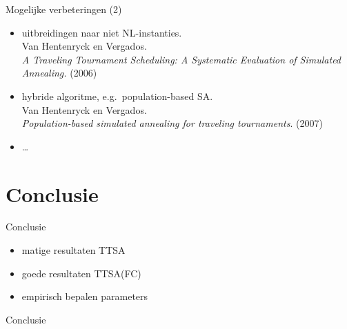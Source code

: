 \documentclass{beamer}
\begin{document}
\begin{frame}{Mogelijke verbeteringen (2)}
 \begin{itemize}[<+->]
  \item uitbreidingen naar niet NL-instanties. \\Van Hentenryck en Vergados. \\\emph{A Traveling Tournament Scheduling: A Systematic Evaluation of Simulated Annealing.} (2006)
  \item hybride algoritme, e.g.~population-based SA. \\Van Hentenryck en Vergados. \\\emph{Population-based simulated annealing for traveling tournaments}. (2007)
  \item \ldots
\end{itemize}
\end{frame}



\section{Conclusie}
\begin{frame}{Conclusie}
\begin{itemize}[<+->]
 \item matige resultaten TTSA
 \item goede resultaten TTSA(FC)
 \item empirisch bepalen parameters

\end{itemize}


\end{frame}

\begin{frame}{Conclusie}

\end{frame}



% 
\end{document}
